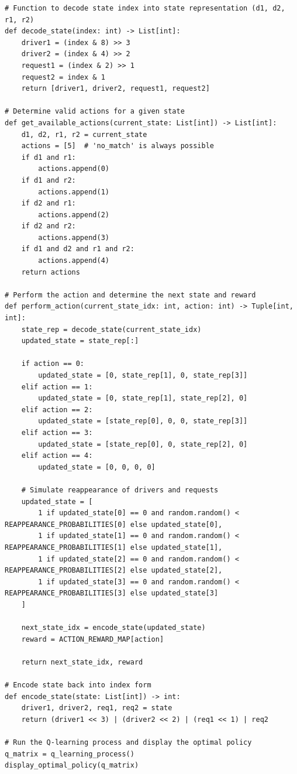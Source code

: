 \documentclass[letter,11pt]{article}
\begin{document}
\begin{lstlisting}
# Function to decode state index into state representation (d1, d2, r1, r2)
def decode_state(index: int) -> List[int]:
    driver1 = (index & 8) >> 3
    driver2 = (index & 4) >> 2
    request1 = (index & 2) >> 1
    request2 = index & 1
    return [driver1, driver2, request1, request2]

# Determine valid actions for a given state
def get_available_actions(current_state: List[int]) -> List[int]:
    d1, d2, r1, r2 = current_state
    actions = [5]  # 'no_match' is always possible
    if d1 and r1:
        actions.append(0)
    if d1 and r2:
        actions.append(1)
    if d2 and r1:
        actions.append(2)
    if d2 and r2:
        actions.append(3)
    if d1 and d2 and r1 and r2:
        actions.append(4)
    return actions

# Perform the action and determine the next state and reward
def perform_action(current_state_idx: int, action: int) -> Tuple[int, int]:
    state_rep = decode_state(current_state_idx)
    updated_state = state_rep[:]

    if action == 0:
        updated_state = [0, state_rep[1], 0, state_rep[3]]
    elif action == 1:
        updated_state = [0, state_rep[1], state_rep[2], 0]
    elif action == 2:
        updated_state = [state_rep[0], 0, 0, state_rep[3]]
    elif action == 3:
        updated_state = [state_rep[0], 0, state_rep[2], 0]
    elif action == 4:
        updated_state = [0, 0, 0, 0]
    
    # Simulate reappearance of drivers and requests
    updated_state = [
        1 if updated_state[0] == 0 and random.random() < REAPPEARANCE_PROBABILITIES[0] else updated_state[0],
        1 if updated_state[1] == 0 and random.random() < REAPPEARANCE_PROBABILITIES[1] else updated_state[1],
        1 if updated_state[2] == 0 and random.random() < REAPPEARANCE_PROBABILITIES[2] else updated_state[2],
        1 if updated_state[3] == 0 and random.random() < REAPPEARANCE_PROBABILITIES[3] else updated_state[3]
    ]
    
    next_state_idx = encode_state(updated_state)
    reward = ACTION_REWARD_MAP[action]
    
    return next_state_idx, reward

# Encode state back into index form
def encode_state(state: List[int]) -> int:
    driver1, driver2, req1, req2 = state
    return (driver1 << 3) | (driver2 << 2) | (req1 << 1) | req2

# Run the Q-learning process and display the optimal policy
q_matrix = q_learning_process()
display_optimal_policy(q_matrix)

\end{lstlisting}

 
\end{document}
